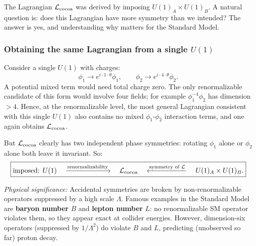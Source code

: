 \documentclass[../main.tex]{subfiles}
\begin{document}
The Lagrangian $\mathcal{L}_{\rm cocoa}$ was derived by imposing $U(1)_A\times U(1)_B$.  A natural question is: does this Lagrangian have more symmetry than we intended?  The answer is yes, and understanding why matters for the Standard Model.

\subsubsection*{Obtaining the same Lagrangian from a single $U(1)$}

Consider a single $U(1)$ with charges:
\begin{equation}
  \phi_1\to e^{i\cdot1\cdot\theta}\phi_1, \qquad
  \phi_2\to e^{i\cdot4\cdot\theta}\phi_2.
  \label{eq:lec10:single-u1-example}
\end{equation}
A potential mixed term would need total charge zero.  The only renormalizable candidate of this form would involve four fields; for example $\phi_1^{-4}\phi_2$ has dimension $>4$.  Hence, at the renormalizable level, the most general Lagrangian consistent with this single $U(1)$ also contains no mixed $\phi_1$-$\phi_2$ interaction terms, and one again obtains $\mathcal{L}_{\rm cocoa}$.

But $\mathcal{L}_{\rm cocoa}$ clearly has two independent phase symmetries: rotating $\phi_1$ alone or $\phi_2$ alone both leave it invariant.  So:
\begin{equation}
  \boxed{
  \text{imposed: }U(1)
  \quad\xrightarrow{\text{renormalizability}}\quad
  \mathcal{L}_{\rm cocoa}
  \quad\xleftarrow{\text{symmetry of }\mathcal{L}}\quad
  U(1)_A\times U(1)_B.}
  \label{eq:lec10:accidental-flow}
\end{equation}


\textit{Physical significance:} Accidental symmetries are broken by non-renormalizable operators suppressed by a high scale $\Lambda$.  Famous examples in the Standard Model are \textbf{baryon number} $B$ and \textbf{lepton number} $L$: no renormalizable SM operator violates them, so they appear exact at collider energies.  However, dimension-six operators (suppressed by $1/\Lambda^2$) do violate $B$ and $L$, predicting (unobserved so far) proton decay.
\end{document}
